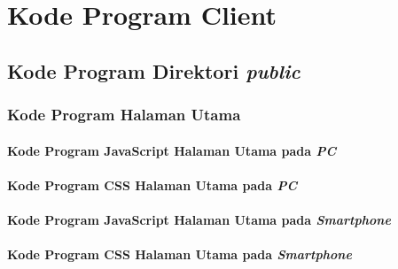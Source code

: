 \chapter{Kode Program Client}
\label{lamp:A}

%
%
%

\setcounter{secnumdepth}{4}


\section{Kode Program Direktori \textit{public}}
\subsection{Kode Program Halaman Utama}
\subsubsection{Kode Program JavaScript Halaman Utama pada \textit{PC}}


\subsubsection{Kode Program CSS Halaman Utama pada \textit{PC}}


\subsubsection{Kode Program JavaScript Halaman Utama pada \textit{Smartphone}}


\subsubsection{Kode Program CSS Halaman Utama pada \textit{Smartphone}}


